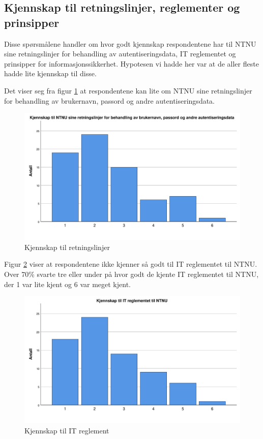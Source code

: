 \subsection{Kjennskap til retningslinjer, reglementer og prinsipper}
Disse spørsmålene handler om hvor godt kjennskap respondentene har til NTNU sine retningslinjer for behandling av autentiseringsdata, IT reglementet og prinsipper for informasjonssikkerhet. Hypotesen vi hadde her var at de aller fleste hadde lite kjennskap til disse.

Det viser seg fra figur \ref{fig:case2-retningslinjer} at respondentene kan lite om NTNU sine retningslinjer for behandling av brukernavn, passord og andre autentiseringsdata. 
\begin{figure}[H]
    \centering
    \includegraphics[scale=0.5]{case_2/bilder/spss/retningslinjer.pdf}
    \caption[Kjennskap til retningslinjer]{Kjennskap til retningslinjer}
    \label{fig:case2-retningslinjer}
\end{figure}

Figur \ref{fig:case2-ITreglement} viser at respondentene ikke kjenner så godt til IT reglementet til NTNU. Over 70\% svarte tre eller under på hvor godt de kjente IT reglementet til NTNU, der 1 var lite kjent og 6 var meget kjent.  
\begin{figure}[H]
    \centering
    \includegraphics[scale=0.5]{case_2/bilder/spss/ITreglement.pdf}
    \caption[Kjennskap til IT-reglement]{Kjennskap til IT reglement}
    \label{fig:case2-ITreglement}
\end{figure}

